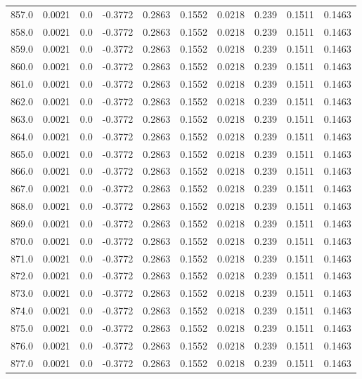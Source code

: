 \begin{longtable}{lrrrrrrrrr}
857.0 & 0.0021 & 0.0 & -0.3772 & 0.2863 & 0.1552 & 0.0218 & 0.239 & 0.1511 & 0.1463 \\
858.0 & 0.0021 & 0.0 & -0.3772 & 0.2863 & 0.1552 & 0.0218 & 0.239 & 0.1511 & 0.1463 \\
859.0 & 0.0021 & 0.0 & -0.3772 & 0.2863 & 0.1552 & 0.0218 & 0.239 & 0.1511 & 0.1463 \\
860.0 & 0.0021 & 0.0 & -0.3772 & 0.2863 & 0.1552 & 0.0218 & 0.239 & 0.1511 & 0.1463 \\
861.0 & 0.0021 & 0.0 & -0.3772 & 0.2863 & 0.1552 & 0.0218 & 0.239 & 0.1511 & 0.1463 \\
862.0 & 0.0021 & 0.0 & -0.3772 & 0.2863 & 0.1552 & 0.0218 & 0.239 & 0.1511 & 0.1463 \\
863.0 & 0.0021 & 0.0 & -0.3772 & 0.2863 & 0.1552 & 0.0218 & 0.239 & 0.1511 & 0.1463 \\
864.0 & 0.0021 & 0.0 & -0.3772 & 0.2863 & 0.1552 & 0.0218 & 0.239 & 0.1511 & 0.1463 \\
865.0 & 0.0021 & 0.0 & -0.3772 & 0.2863 & 0.1552 & 0.0218 & 0.239 & 0.1511 & 0.1463 \\
866.0 & 0.0021 & 0.0 & -0.3772 & 0.2863 & 0.1552 & 0.0218 & 0.239 & 0.1511 & 0.1463 \\
867.0 & 0.0021 & 0.0 & -0.3772 & 0.2863 & 0.1552 & 0.0218 & 0.239 & 0.1511 & 0.1463 \\
868.0 & 0.0021 & 0.0 & -0.3772 & 0.2863 & 0.1552 & 0.0218 & 0.239 & 0.1511 & 0.1463 \\
869.0 & 0.0021 & 0.0 & -0.3772 & 0.2863 & 0.1552 & 0.0218 & 0.239 & 0.1511 & 0.1463 \\
870.0 & 0.0021 & 0.0 & -0.3772 & 0.2863 & 0.1552 & 0.0218 & 0.239 & 0.1511 & 0.1463 \\
871.0 & 0.0021 & 0.0 & -0.3772 & 0.2863 & 0.1552 & 0.0218 & 0.239 & 0.1511 & 0.1463 \\
872.0 & 0.0021 & 0.0 & -0.3772 & 0.2863 & 0.1552 & 0.0218 & 0.239 & 0.1511 & 0.1463 \\
873.0 & 0.0021 & 0.0 & -0.3772 & 0.2863 & 0.1552 & 0.0218 & 0.239 & 0.1511 & 0.1463 \\
874.0 & 0.0021 & 0.0 & -0.3772 & 0.2863 & 0.1552 & 0.0218 & 0.239 & 0.1511 & 0.1463 \\
875.0 & 0.0021 & 0.0 & -0.3772 & 0.2863 & 0.1552 & 0.0218 & 0.239 & 0.1511 & 0.1463 \\
876.0 & 0.0021 & 0.0 & -0.3772 & 0.2863 & 0.1552 & 0.0218 & 0.239 & 0.1511 & 0.1463 \\
877.0 & 0.0021 & 0.0 & -0.3772 & 0.2863 & 0.1552 & 0.0218 & 0.239 & 0.1511 & 0.1463 \\

\end{longtable}
